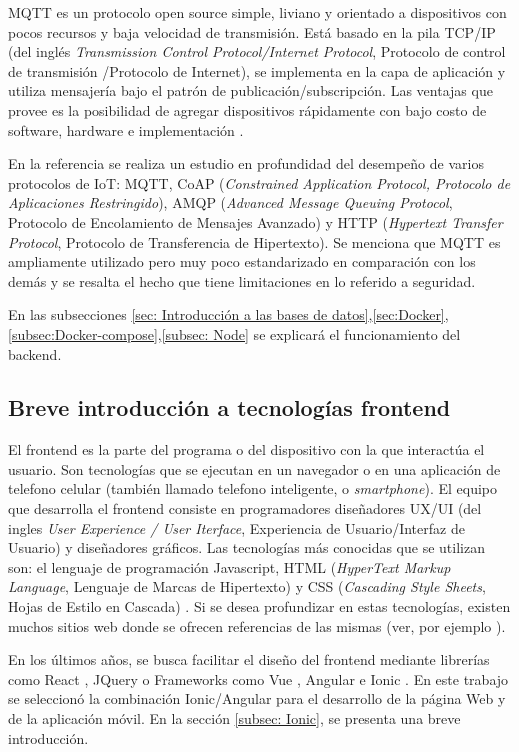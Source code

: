 MQTT es un protocolo open source simple, liviano y orientado a dispositivos con pocos recursos y baja velocidad de transmisión. Está basado en la pila TCP/IP (del inglés \textit{Transmission Control Protocol/Internet Protocol}, Protocolo de control de transmisión /Protocolo de Internet), se implementa en la capa de aplicación y utiliza mensajería bajo el patrón de publicación/subscripción. Las ventajas que provee es la posibilidad de agregar dispositivos rápidamente con bajo costo de software, hardware e implementación \citep{ARTICLE:2}.

En la referencia \citep{ARTICLE:2} se realiza un estudio en profundidad del desempeño de varios protocolos de IoT: MQTT, CoAP (\textit{Constrained Application Protocol, Protocolo de Aplicaciones Restringido}), AMQP  (\textit{Advanced Message Queuing Protocol}, Protocolo de Encolamiento de Mensajes Avanzado) y HTTP (\textit{Hypertext Transfer Protocol}, Protocolo de Transferencia de Hipertexto). Se menciona que MQTT es ampliamente utilizado pero muy poco estandarizado en comparación con los demás y se resalta el hecho que tiene limitaciones en lo referido a seguridad.

En las subsecciones \ref{sec: Introducción a las bases de datos},\ref{sec:Docker},\ref{subsec:Docker-compose},\ref{subsec: Node} se explicará el funcionamiento del backend.
\subsection{Breve introducción a tecnologías frontend}
\label{Breve introducción a tecnologías frontend}
El frontend es la parte del programa o del dispositivo con la que interactúa el usuario. Son tecnologías que se ejecutan en un navegador o en una aplicación de telefono celular (también llamado telefono inteligente, o \textit{smartphone}). El equipo que desarrolla el frontend consiste en programadores diseñadores UX/UI (del ingles \textit{User Experience / User Iterface}, Experiencia de Usuario/Interfaz de Usuario) y diseñadores gráficos. Las tecnologías más conocidas que se utilizan son: el lenguaje de programación Javascript, HTML (\textit{HyperText Markup Language}, Lenguaje de Marcas de Hipertexto) y CSS (\textit{Cascading Style Sheets}, Hojas de Estilo en Cascada) \citep{ARTICLE:4}. Si se desea profundizar en estas tecnologías, existen muchos sitios web donde se ofrecen referencias de las mismas (ver, por ejemplo \citep{WEBSITE:13}).  

En los últimos años, se busca facilitar el diseño del frontend mediante librerías como React \citep{WEBSITE:14},  JQuery \citep{WEBSITE:17} o Frameworks como Vue \citep{WEBSITE:15}, Angular \citep{WEBSITE:16} e Ionic \citep{WEBSITE:18}. En este trabajo se seleccionó la combinación Ionic/Angular para el desarrollo de la página Web y de la aplicación móvil. En la sección \ref{subsec: Ionic}, se presenta una breve introducción.

